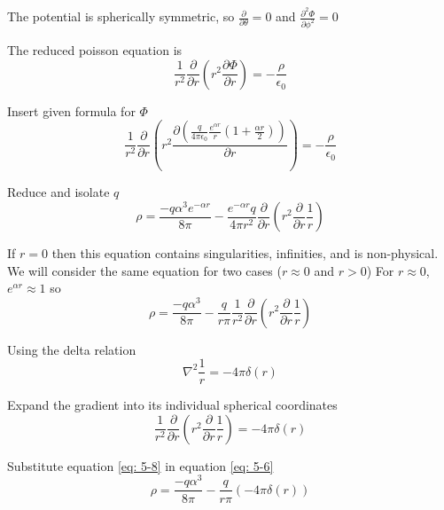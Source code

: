 \documentclass[English]{article}
\begin{document}
    The potential is spherically symmetric, so $\frac{\partial}{\partial \theta} = 0$ and $\frac{\partial^2 \Phi}{\partial \phi^2} = 0$

    The reduced poisson equation is
    \begin{equation} \label{eq: 5-3}
        \frac{1}{r^2} \frac{\partial}{\partial r} (r^2 \frac{\partial \Phi}{\partial r}) = - \frac{\rho}{\epsilon_0}
    \end{equation}

    Insert given formula for $\Phi$
    \begin{equation} \label{eq: 5-4}
        \frac{1}{r^2} \frac{\partial}{\partial r} (r^2 \frac{\partial (\frac{q}{4 \pi \epsilon_0} \frac{e^{\alpha r}}{r} (1 + \frac{\alpha r}{2}))}{\partial r}) = - \frac{\rho}{\epsilon_0}
    \end{equation}

    Reduce and isolate $q$
    \begin{equation} \label{eq: 5-5}
        \rho = \frac{- q \alpha^3 e^{-\alpha r}}{8 \pi} - \frac{e^{-\alpha r} q}{4 \pi r^2} \frac{\partial}{\partial r} (r^2 \frac{\partial}{\partial r} \frac{1}{r})
    \end{equation}

    If $r=0$ then this equation contains singularities, infinities, and is non-physical.
    We will consider the same equation for two cases ($r \approx 0$ and $r > 0$)
    For $r \approx 0$, $e^{\alpha r} \approx 1$ so 
    \begin{equation} \label{eq: 5-6}
        \rho = \frac{-q \alpha^3}{8 \pi} - \frac{q}{r \pi} \frac{1}{r^2} \frac{\partial}{\partial r} (r^2 \frac{\partial}{\partial r} \frac{1}{r})
    \end{equation}

    Using the delta relation
    \begin{equation} \label{eq: 5-7}
        \nabla^2 \frac{1}{r} = -4 \pi \delta(r)
    \end{equation}

    Expand the gradient into its individual spherical coordinates
    \begin{equation} \label{eq: 5-8}
        \frac{1}{r^2} \frac{\partial}{\partial r} (r^2 \frac{\partial}{\partial r} \frac{1}{r}) = - 4 \pi \delta(r)
    \end{equation}

    Substitute equation \ref{eq: 5-8} in equation \ref{eq: 5-6}
    \begin{equation} \label{eq: 5-9}
        \rho = \frac{-q \alpha^3}{8 \pi} - \frac{q}{r \pi} (- 4 \pi \delta(r))
    \end{equation}
\end{document}

